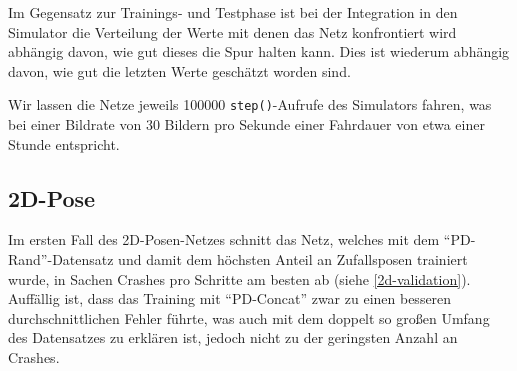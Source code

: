 Im Gegensatz zur Trainings- und Testphase ist bei der Integration in den Simulator die Verteilung der Werte mit denen das Netz konfrontiert wird abhängig davon, wie gut dieses die Spur halten kann. Dies ist wiederum abhängig davon, wie gut die letzten Werte geschätzt worden sind.

Wir lassen die Netze jeweils 100000 \texttt{step()}-Aufrufe des Simulators fahren, was bei einer Bildrate von 30 Bildern pro Sekunde einer Fahrdauer von etwa einer Stunde entspricht.\\

\subsection{2D-Pose}

Im ersten Fall des 2D-Posen-Netzes schnitt das Netz, welches mit dem ``PD-Rand''-Datensatz und damit dem höchsten Anteil an Zufallsposen trainiert wurde, in Sachen Crashes pro Schritte am besten ab (siehe \ref{2d-validation}). Auffällig ist, dass das Training mit ``PD-Concat'' zwar zu einen besseren durchschnittlichen Fehler führte, was auch mit dem doppelt so großen Umfang des Datensatzes zu erklären ist, jedoch nicht zu der geringsten Anzahl an Crashes.  

